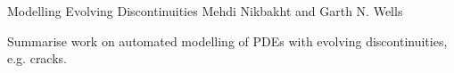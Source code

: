               {Modelling Evolving Discontinuities}
              {Mehdi Nikbakht and Garth N. Wells}

\editornote{[nikbakht]}

Summarise work on automated modelling of PDEs with evolving
discontinuities, e.g. cracks.
